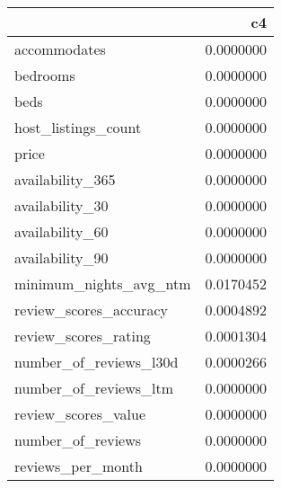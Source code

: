 
\begin{tabular}[t]{lr}
\toprule
  & c4\\
\midrule
accommodates & 0.0000000\\
bedrooms & 0.0000000\\
beds & 0.0000000\\
host\_listings\_count & 0.0000000\\
price & 0.0000000\\
\addlinespace
availability\_365 & 0.0000000\\
availability\_30 & 0.0000000\\
availability\_60 & 0.0000000\\
availability\_90 & 0.0000000\\
minimum\_nights\_avg\_ntm & 0.0170452\\
\addlinespace
review\_scores\_accuracy & 0.0004892\\
review\_scores\_rating & 0.0001304\\
number\_of\_reviews\_l30d & 0.0000266\\
number\_of\_reviews\_ltm & 0.0000000\\
review\_scores\_value & 0.0000000\\
\addlinespace
number\_of\_reviews & 0.0000000\\
reviews\_per\_month & 0.0000000\\
\bottomrule
\end{tabular}